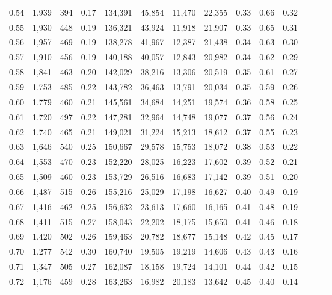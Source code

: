 \begin{tabular}{rrrrrrrrrrrrrr}
0.54 &  1,939 &  394 &  0.17 &  134,391 &   45,854 &  11,470 &  22,355 &  0.33 &  0.66 &      0.32 \\
0.55 &  1,930 &  448 &  0.19 &  136,321 &   43,924 &  11,918 &  21,907 &  0.33 &  0.65 &      0.31 \\
0.56 &  1,957 &  469 &  0.19 &  138,278 &   41,967 &  12,387 &  21,438 &  0.34 &  0.63 &      0.30 \\
0.57 &  1,910 &  456 &  0.19 &  140,188 &   40,057 &  12,843 &  20,982 &  0.34 &  0.62 &      0.29 \\
0.58 &  1,841 &  463 &  0.20 &  142,029 &   38,216 &  13,306 &  20,519 &  0.35 &  0.61 &      0.27 \\
0.59 &  1,753 &  485 &  0.22 &  143,782 &   36,463 &  13,791 &  20,034 &  0.35 &  0.59 &      0.26 \\
0.60 &  1,779 &  460 &  0.21 &  145,561 &   34,684 &  14,251 &  19,574 &  0.36 &  0.58 &      0.25 \\
0.61 &  1,720 &  497 &  0.22 &  147,281 &   32,964 &  14,748 &  19,077 &  0.37 &  0.56 &      0.24 \\
0.62 &  1,740 &  465 &  0.21 &  149,021 &   31,224 &  15,213 &  18,612 &  0.37 &  0.55 &      0.23 \\
0.63 &  1,646 &  540 &  0.25 &  150,667 &   29,578 &  15,753 &  18,072 &  0.38 &  0.53 &      0.22 \\
0.64 &  1,553 &  470 &  0.23 &  152,220 &   28,025 &  16,223 &  17,602 &  0.39 &  0.52 &      0.21 \\
0.65 &  1,509 &  460 &  0.23 &  153,729 &   26,516 &  16,683 &  17,142 &  0.39 &  0.51 &      0.20 \\
0.66 &  1,487 &  515 &  0.26 &  155,216 &   25,029 &  17,198 &  16,627 &  0.40 &  0.49 &      0.19 \\
0.67 &  1,416 &  462 &  0.25 &  156,632 &   23,613 &  17,660 &  16,165 &  0.41 &  0.48 &      0.19 \\
0.68 &  1,411 &  515 &  0.27 &  158,043 &   22,202 &  18,175 &  15,650 &  0.41 &  0.46 &      0.18 \\
0.69 &  1,420 &  502 &  0.26 &  159,463 &   20,782 &  18,677 &  15,148 &  0.42 &  0.45 &      0.17 \\
0.70 &  1,277 &  542 &  0.30 &  160,740 &   19,505 &  19,219 &  14,606 &  0.43 &  0.43 &      0.16 \\
0.71 &  1,347 &  505 &  0.27 &  162,087 &   18,158 &  19,724 &  14,101 &  0.44 &  0.42 &      0.15 \\
0.72 &  1,176 &  459 &  0.28 &  163,263 &   16,982 &  20,183 &  13,642 &  0.45 &  0.40 &      0.14 \\

\end{tabular}
